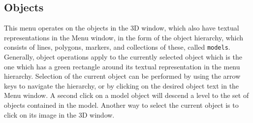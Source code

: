 \documentclass[11pt,letterpaper]{article}
\newcommand{\ident}[1]{{\tt #1}}
\begin{document}
\subsection{Objects}

This menu operates on the objects in the 3D window,
which also have textual representations in the Menu window, in the form of
the object hierarchy, which consists of lines, polygons, markers, and
collections of these, called \ident{models}.  Generally, object operations
apply to the currently selected object which is the one which has a green
rectangle around its textual representation in the menu hierarchy.  Selection
of the current object can be performed by using the arrow keys to navigate
the hierarchy, or by clicking on the desired object text in the Menu window.
A second click on a model object will descend a level to the set of objects
contained in the model.  Another way to select the current object is to
click on its image in the 3D window.
\end{document}
